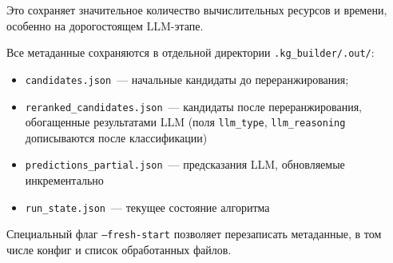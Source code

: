 Это сохраняет значительное количество вычислительных ресурсов и времени, особенно на дорогостоящем LLM-этапе.

Все метаданные сохраняются в отдельной директории \texttt{.kg\_builder/.out/}:
\begin{itemize}
    \item \texttt{candidates.json}~--- начальные кандидаты до переранжирования;
    \item \texttt{reranked\_candidates.json}~--- кандидаты после переранжирования,
          обогащенные результатами LLM (поля \texttt{llm\_type}, \texttt{llm\_reasoning}
          дописываются после классификации)
    \item \texttt{predictions\_partial.json}~--- предсказания LLM, обновляемые инкрементально
    \item \texttt{run\_state.json}~--- текущее состояние алгоритма
\end{itemize}

Специальный флаг \texttt{--fresh-start} позволяет перезаписать метаданные,
в том числе конфиг и список обработанных файлов.
